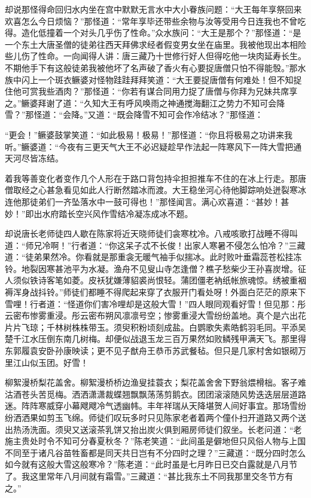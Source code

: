 \documentclass[12pt,UTF8]{ctexbook}
\begin{document}
却说那怪得命回归水内坐在宫中默默无言水中大小眷族问题：“大王每年享祭回来欢喜怎么今日烦恼？”那怪道：“常年享毕还带些余物与汝等受用今日连我也不曾吃得。造化低撞着一个对头几乎伤了性命。”众水族问：“大王是那个？”那怪道：“是一个东土大唐圣僧的徒弟往西天拜佛求经者假变男女坐在庙里。我被他现出本相险些儿伤了性命。一向闻得人讲：唐三藏乃十世修行好人但得吃他一块肉延寿长生。不期他手下有这般徒弟我被他坏了名声破了香火有心要捉唐僧只怕不得能彀。”那水族中闪上一个斑衣鳜婆对怪物跬跬拜拜笑道：“大王要捉唐僧有何难处！但不知捉住他可赏我些酒肉？”那怪道：“你若有谋合同用力捉了唐僧与你拜为兄妹共席享之。”鳜婆拜谢了道：“久知大王有呼风唤雨之神通搅海翻江之势力不知可会降雪？”那怪道：“会降。”又道：“既会降雪不知可会作冷结冰？”那怪道：

“更会！”鳜婆鼓掌笑道：“如此极易！极易！”那怪道：“你且将极易之功讲来我听。”鳜婆道：“今夜有三更天气大王不必迟疑趁早作法起一阵寒风下一阵大雪把通天河尽皆冻结。

着我等善变化者变作几个人形在于路口背包持伞担担推车不住的在冰上行走。那唐僧取经之心甚急看见如此人行断然踏冰而渡。大王稳坐河心待他脚踪响处迸裂寒冰连他那徒弟们一齐坠落水中一鼓可得也！”那怪闻言。满心欢喜道：“甚妙！甚妙！”即出水府踏长空兴风作雪结冷凝冻成冰不题。

却说唐长老师徒四人歇在陈家将近天晓师徒们衾寒枕冷。八戒咳歌打战睡不得叫道：“师兄冷啊！”行者道：“你这呆子忒不长俊！出家人寒暑不侵怎么怕冷？”三藏道：“徒弟果然冷。你看就是那重衾无暖气袖手似揣冰。此时败叶垂霜蕊苍松挂冻铃。地裂因寒甚池平为水凝。渔舟不见叟山寺怎逢僧？樵子愁柴少王孙喜炭增。征人须似铁诗客笔如菱。皮袄犹嫌薄貂裘尚恨轻。蒲团僵老衲纸帐旅魂惊。绣被重裀褥浑身战抖铃。”师徒们都睡不得爬起来穿了衣服开门看处呀！外面白茫茫的原来下雪哩！行者道：“怪道你们害冷哩却是这般大雪！”四人眼同观看好雪！但见那：彤云密布惨雾重浸。彤云密布朔风凛凛号空；惨雾重浸大雪纷纷盖地。真个是六出花片片飞琼；千林树株株带玉。须臾积粉顷刻成盐。白鹦歌失素皓鹤羽毛同。平添吴楚千江水压倒东南几树梅。却便似战退玉龙三百万果然如败鳞残甲满天飞。那里得东郭履袁安卧孙康映读；更不见子猷舟王恭币苏武餐毡。但只是几家村舍如银砌万里江山似玉团。好雪！

柳絮漫桥梨花盖舍。柳絮漫桥桥边渔叟挂蓑衣；梨花盖舍舍下野翁煨榾柮。客子难沽酒苍头苦觅梅。洒洒潇潇裁蝶翘飘飘荡荡剪鹅衣。团团滚滚随风势迭迭层层道路迷。阵阵寒威穿小幕飕飕冷气透幽帏。丰年祥瑞从天降堪贺人间好事宜。那场雪纷纷洒洒果如剪玉飞绵。师徒们叹玩多时只见陈家老者着两个僮仆扫开道路又两个送出热汤洗面。须臾又送滚茶乳饼又抬出炭火俱到厢房师徒们叙坐。长老问道：“老施主贵处时令不知可分春夏秋冬？”陈老笑道：“此间虽是僻地但只风俗人物与上国不同至于诸凡谷苗牲畜都是同天共日岂有不分四时之理？”三藏道：“既分四时怎么如今就有这般大雪这般寒冷？”陈老道：“此时虽是七月昨日已交白露就是八月节了。我这里常年八月间就有霜雪。”三藏道：“甚比我东土不同我那里交冬节方有之。”
\end{document}
